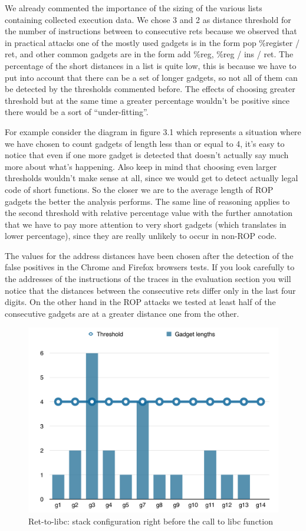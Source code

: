 \documentclass[Lau,binding=0.6cm]{sapthesis}
\begin{document}
We already commented the importance of the sizing of the various lists containing collected execution data. We chose 3 and 2 as distance threshold for the number of instructions between to consecutive rets because we observed that in practical attacks one of the mostly used gadgets is in the form pop \%register / ret, and other common gadgets are in the form add \%reg, \%reg / ins / ret. The percentage of the short distances in a list is quite low, this is because we have to put into account that there can be a set of longer gadgets, so not all of them can be detected by the thresholds commented before. The effects of choosing greater threshold but at the same time a greater percentage wouldn’t be positive since there would be a sort of “under-fitting”. 

For example consider the diagram in figure 3.1 which represents a situation where we have chosen to count gadgets of length less than or equal to 4, it’s easy to notice that even if one more gadget is detected that doesn’t actually say much more about what’s happening. Also keep in mind that choosing even larger thresholds wouldn’t make sense at all, since we would get to detect actually legal code of short functions. So the closer we are to the average length of ROP gadgets the better the analysis performs. The same line of reasoning applies to the second threshold with relative percentage value with the further annotation that we have to pay more attention to very short gadgets (which translates in lower percentage), since they are really unlikely to occur in non-ROP code.  

The values for the address distances have been chosen after the detection of the false positives in the Chrome and Firefox browsers tests. If you look carefully to the addresses of the instructions of the traces in the evaluation section you will notice that the distances between the consecutive rets differ only in the last four digits. On the other hand in the ROP attacks we tested at least half of the consecutive gadgets are at a greater distance one from the other.

\begin{figure}
\centering
\includegraphics[width=1\textwidth]{params}
\caption{Ret-to-libc: stack configuration right before the call to libc function}
\label{fig:largenenough}
\end{figure}
\end{document}

